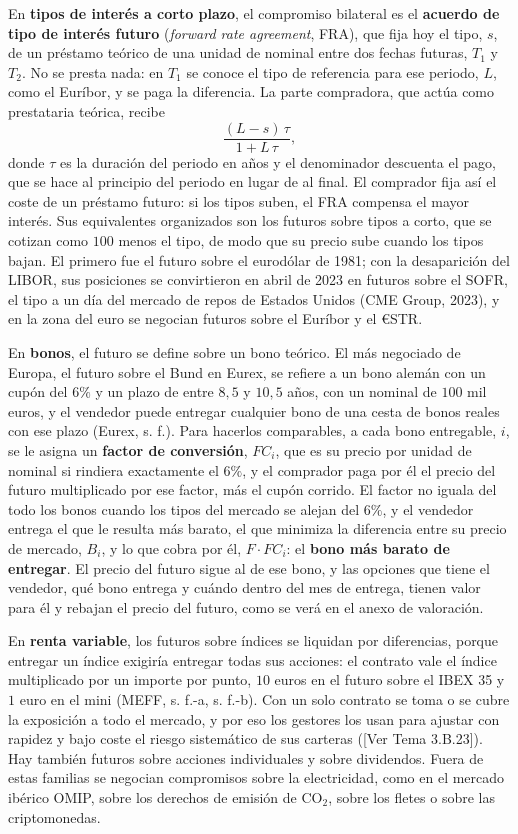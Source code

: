 \documentclass[10pt,a4paper]{article}
\newcommand{\authorfont}[1]{{\fontfamily{EBGaramond-TLF}\selectfont #1}}
\newcounter{anexo}
\begin{document}
En \textbf{tipos de interés a corto plazo}, el compromiso bilateral es el \textbf{acuerdo de tipo de interés futuro} (\textit{forward rate agreement}, FRA), que fija hoy el tipo, $s$, de un préstamo teórico de una unidad de nominal entre dos fechas futuras, $T_1$ y $T_2$. No se presta nada: en $T_1$ se conoce el tipo de referencia para ese periodo, $L$, como el Euríbor, y se paga la diferencia. La parte compradora, que actúa como prestataria teórica, recibe
$$\frac{(L-s)\,\tau}{1+L\,\tau},$$
donde $\tau$ es la duración del periodo en años y el denominador descuenta el pago, que se hace al principio del periodo en lugar de al final. El comprador fija así el coste de un préstamo futuro: si los tipos suben, el FRA compensa el mayor interés. Sus equivalentes organizados son los futuros sobre tipos a corto, que se cotizan como $100$ menos el tipo, de modo que su precio sube cuando los tipos bajan. El primero fue el futuro sobre el eurodólar de 1981; con la desaparición del LIBOR, sus posiciones se convirtieron en abril de 2023 en futuros sobre el SOFR, el tipo a un día del mercado de repos de Estados Unidos (CME Group, 2023), y en la zona del euro se negocian futuros sobre el Euríbor y el €STR.

En \textbf{bonos}, el futuro se define sobre un bono teórico. El más negociado de Europa, el futuro sobre el Bund en Eurex, se refiere a un bono alemán con un cupón del $6\%$ y un plazo de entre $8{,}5$ y $10{,}5$ años, con un nominal de $100$ mil euros, y el vendedor puede entregar cualquier bono de una cesta de bonos reales con ese plazo (Eurex, s. f.). Para hacerlos comparables, a cada bono entregable, $i$, se le asigna un \textbf{factor de conversión}, $FC_i$, que es su precio por unidad de nominal si rindiera exactamente el $6\%$, y el comprador paga por él el precio del futuro multiplicado por ese factor, más el cupón corrido. El factor no iguala del todo los bonos cuando los tipos del mercado se alejan del $6\%$, y el vendedor entrega el que le resulta más barato, el que minimiza la diferencia entre su precio de mercado, $B_i$, y lo que cobra por él, $F\cdot FC_i$: el \textbf{bono más barato de entregar}. El precio del futuro sigue al de ese bono, y las opciones que tiene el vendedor, qué bono entrega y cuándo dentro del mes de entrega, tienen valor para él y rebajan el precio del futuro, como se verá en el anexo de valoración.

En \textbf{renta variable}, los futuros sobre índices se liquidan por diferencias, porque entregar un índice exigiría entregar todas sus acciones: el contrato vale el índice multiplicado por un importe por punto, $10$ euros en el futuro sobre el IBEX 35 y $1$ euro en el mini (MEFF, s. f.-a, s. f.-b). Con un solo contrato se toma o se cubre la exposición a todo el mercado, y por eso los gestores los usan para ajustar con rapidez y bajo coste el riesgo sistemático de sus carteras ([\authorfont{Ver Tema 3.B.23}]). Hay también futuros sobre acciones individuales y sobre dividendos. Fuera de estas familias se negocian compromisos sobre la electricidad, como en el mercado ibérico OMIP, sobre los derechos de emisión de CO$_2$, sobre los fletes o sobre las criptomonedas.
\end{document}
